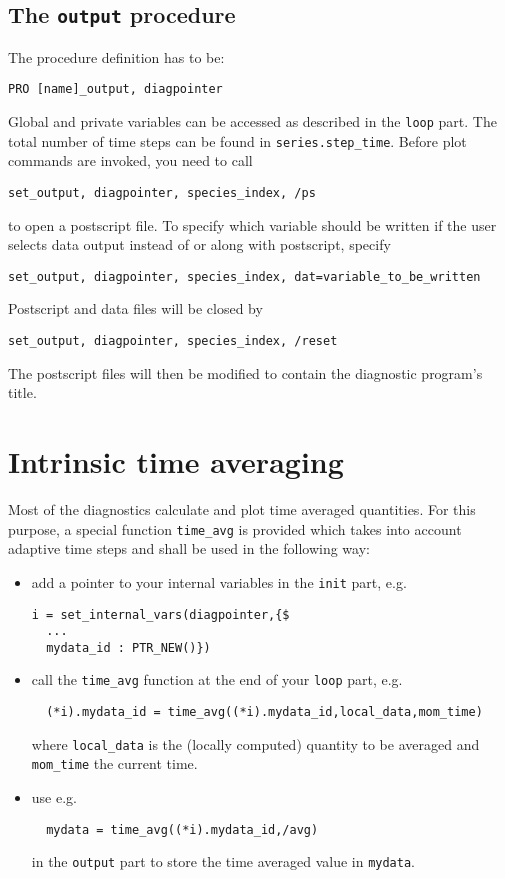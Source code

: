 \documentclass[12pt]{article}
\begin{document}
\subsection{The \texttt{output} procedure}

The procedure definition has to be:
\begin{verbatim}
PRO [name]_output, diagpointer
\end{verbatim}
Global and private variables can be accessed as described in the
{\tt loop} part. The  total number of time steps can be found in
{\tt series.step\_time}. Before plot commands are invoked, you
need to call
\begin{verbatim}
set_output, diagpointer, species_index, /ps
\end{verbatim}
to open a postscript file. To specify which variable should be
written if the user selects data output instead of or along with
postscript, specify
\begin{verbatim}
set_output, diagpointer, species_index, dat=variable_to_be_written
\end{verbatim}
Postscript and data files will be closed by
\begin{verbatim}
set_output, diagpointer, species_index, /reset
\end{verbatim}
The postscript files will then be modified to contain the
diagnostic program's title.

\section{Intrinsic time averaging}
Most of the diagnostics calculate and plot time averaged quantities.
For this purpose, a special function \texttt{time\_avg} is provided 
which takes into account adaptive time steps and 
shall be used in the following way:
\begin{itemize}
\item add a pointer to your internal variables in the \texttt{init} part,
e.g. 
\begin{verbatim}
i = set_internal_vars(diagpointer,{$
  ...
  mydata_id : PTR_NEW()})
\end{verbatim}
%
\item call the \texttt{time\_avg} function at the end of your 
\texttt{loop} part, e.g.
\begin{verbatim}
  (*i).mydata_id = time_avg((*i).mydata_id,local_data,mom_time)
\end{verbatim}
where \texttt{local\_data} is the (locally computed) quantity 
to be averaged and \texttt{mom\_time} the current time.
\item use e.g.
\begin{verbatim}
  mydata = time_avg((*i).mydata_id,/avg)
\end{verbatim}
in the \texttt{output} part to store the time averaged value
in \texttt{mydata}.
\end{itemize}
\end{document}
